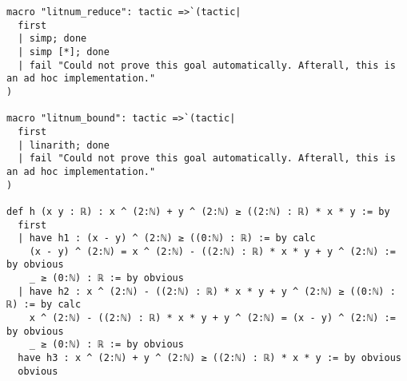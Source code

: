 \documentclass{article}
\begin{document}
\begin{tcolorbox}[colback=white!10, width=\linewidth]
\begin{lstlisting}[language=Lean4]
macro "litnum_reduce": tactic =>`(tactic|
  first
  | simp; done
  | simp [*]; done
  | fail "Could not prove this goal automatically. Afterall, this is an ad hoc implementation."
)

macro "litnum_bound": tactic =>`(tactic|
  first
  | linarith; done
  | fail "Could not prove this goal automatically. Afterall, this is an ad hoc implementation."
)

def h (x y : ℝ) : x ^ (2:ℕ) + y ^ (2:ℕ) ≥ ((2:ℕ) : ℝ) * x * y := by
  first
  | have h1 : (x - y) ^ (2:ℕ) ≥ ((0:ℕ) : ℝ) := by calc
    (x - y) ^ (2:ℕ) = x ^ (2:ℕ) - ((2:ℕ) : ℝ) * x * y + y ^ (2:ℕ) := by obvious
    _ ≥ (0:ℕ) : ℝ := by obvious
  | have h2 : x ^ (2:ℕ) - ((2:ℕ) : ℝ) * x * y + y ^ (2:ℕ) ≥ ((0:ℕ) : ℝ) := by calc
    x ^ (2:ℕ) - ((2:ℕ) : ℝ) * x * y + y ^ (2:ℕ) = (x - y) ^ (2:ℕ) := by obvious
    _ ≥ (0:ℕ) : ℝ := by obvious
  have h3 : x ^ (2:ℕ) + y ^ (2:ℕ) ≥ ((2:ℕ) : ℝ) * x * y := by obvious
  obvious

\end{lstlisting}
\end{tcolorbox}
\end{document}

